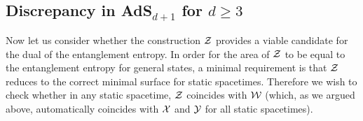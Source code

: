 \documentclass[12pt]{article}
\def\CW{{\cal W}}
\def\CX{{\cal X}}
\def\CY{{\cal Y}}
\def\CZ{{\cal Z}}
\def\Gms{\CW}
\def\Lms{\CY}
\def\Xms{\CX}
\def\Cms{\CZ}
\begin{document}
\subsection{Discrepancy in AdS$_{d+1}$ for $d\ge3$}

Now let us consider whether the construction $\Cms$ provides a viable candidate for the dual of the entanglement entropy. In order for the area of $\Cms$ to be equal to the entanglement entropy for general states, a minimal requirement is that $\Cms$ reduces to the correct minimal surface for static spacetimes.  Therefore we wish to check whether in any static spacetime, $\Cms$ coincides with $\Gms$ (which, as we argued above, automatically coincides with $\Xms$ and $\Lms$ for all static spacetimes).
\end{document}
